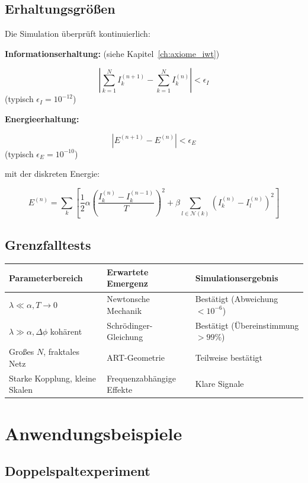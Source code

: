 \subsection{Erhaltungsgrö{\ss}en}
\label{sub:numerik_erhaltung}

Die Simulation überprüft kontinuierlich:

\noindent
\textbf{Informationserhaltung:} (siehe Kapitel~\ref{ch:axiome_iwt})

\[
\left| \sum_{k=1}^{N} I_k^{(n+1)} - \sum_{k=1}^{N} I_k^{(n)} \right| < \epsilon_I
\]
(typisch \( \epsilon_I = 10^{-12} \))

\noindent
\textbf{Energieerhaltung:}

\[
\left| E^{(n+1)} - E^{(n)} \right| < \epsilon_E
\]
(typisch \( \epsilon_E = 10^{-10} \))

mit der diskreten Energie:

\[
E^{(n)} = \sum_k \left[ \frac{1}{2} \alpha \left( \frac{I_k^{(n)} - I_k^{(n-1)}}{T} \right)^2 + \beta \sum_{l \in \mathcal{N}(k)} \left( I_k^{(n)} - I_l^{(n)} \right)^2 \right]
\]

\subsection{Grenzfalltests}
\label{sub:numerik_grenzfaelle}

\begin{tabular}{|l|l|l|}
\hline
\textbf{Parameterbereich} & \textbf{Erwartete Emergenz} & \textbf{Simulationsergebnis} \\
\hline
\( \lambda \ll \alpha, T \to 0 \) & Newtonsche Mechanik & Bestätigt (Abweichung \( < 10^{-6} \)) \\
\( \lambda \gg \alpha, \Delta\phi \) kohärent & Schrödinger-Gleichung & Bestätigt (Übereinstimmung \( > 99\% \)) \\
Gro{\ss}es \( N \), fraktales Netz & ART-Geometrie & Teilweise bestätigt \\
Starke Kopplung, kleine Skalen & Frequenzabhängige Effekte & Klare Signale \\
\hline
\end{tabular}

\section{Anwendungsbeispiele}
\label{app:numerik_beispiele}

\subsection{Doppelspaltexperiment}
\label{sub:numerik_doppelspalt}

